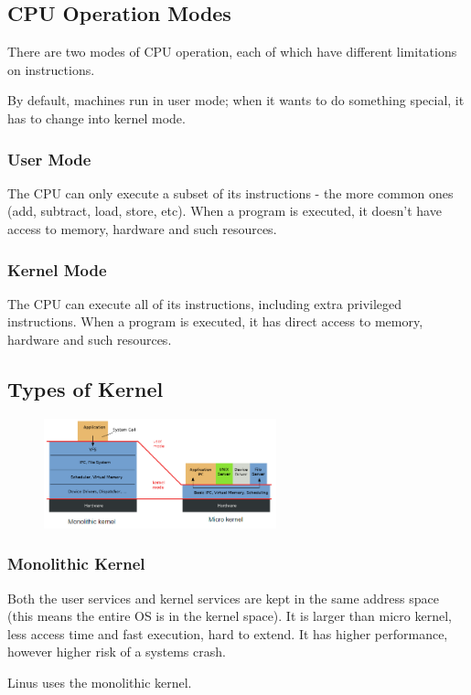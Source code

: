 \subsection*{CPU Operation Modes}
There are two modes of CPU operation, each of which have different limitations on instructions.

By default, machines run in user mode; when it wants to do something special, it has to change into kernel mode. 
\subsubsection*{User Mode}
The CPU can only execute a subset of its instructions - the more common ones (add, subtract, load, store, etc). When a program is executed, it doesn't have access to memory, hardware and such resources.
\subsubsection*{Kernel Mode}
The CPU can execute all of its instructions, including extra privileged instructions. When a program is executed, it has direct access to memory, hardware and such resources.

\subsection*{Types of Kernel}
\begin{figure}[H]
    \centering
    \includegraphics[width=0.6\textwidth]{assets/kernel-types.png}
\end{figure}
\subsubsection*{Monolithic Kernel}
Both the user services and kernel services are kept in the same address space (this means the entire OS is in the kernel space). It is larger than micro kernel, less access time and fast execution, hard to extend. It has higher performance, however higher risk of a systems crash.

Linus uses the monolithic kernel.

